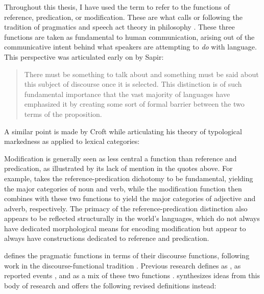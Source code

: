 Throughout this thesis, I have used the term  to refer to the functions of reference, predication, or modification. These are what \textcite[51]{Croft1991} calls  or  following the tradition of pragmatics and speech act theory in philosophy \parencites{Austin1962}{Searle1969}. These three functions are taken as fundamental to human communication, arising out of the communicative intent behind what speakers are attempting to \emph{do} with language. This perspective was articulated early on by Sapir:

\blockquote[{\cite[87]{Sapir1921}}]{There must be something to talk about and something must be said about this subject of discourse once it is selected. This distinction is of such fundamental importance that the vast majority of languages have emphasized it by creating some sort of formal barrier between the two terms of the proposition.}

\noindent A similar point is made by Croft while articulating his theory of typological markedness as applied to lexical categories: 

Modification is generally seen as less central a function than reference and predication, as illustrated by its lack of mention in the quotes above. For example, \textcite[55]{Hengeveld1992} takes the reference-predication dichotomy to be fundamental, yielding the major categories of noun and verb, while the modification function then combines with these two functions to yield the major categories of adjective and adverb, respectively. The primacy of the reference-predication distinction also appears to be reflected structurally in the world's languages, which do not always have dedicated morphological means for encoding modification but appear to always have constructions dedicated to reference and predication.

\textcite[123]{Croft1991} defines the pragmatic functions in terms of their discourse functions, following work in the discourse-functional tradition \parencites{Chafe1976}{HopperThompson1984}{Chafe1987}{DuBois1987}. Previous research defines  as ,  as reported events \parencite[726]{HopperThompson1984}, and  as a mix of these two functions \parencite{Thompson1989}. \textcite[123]{Croft1991} synthesizes ideas from this body of research and offers the following revised definitions instead:


